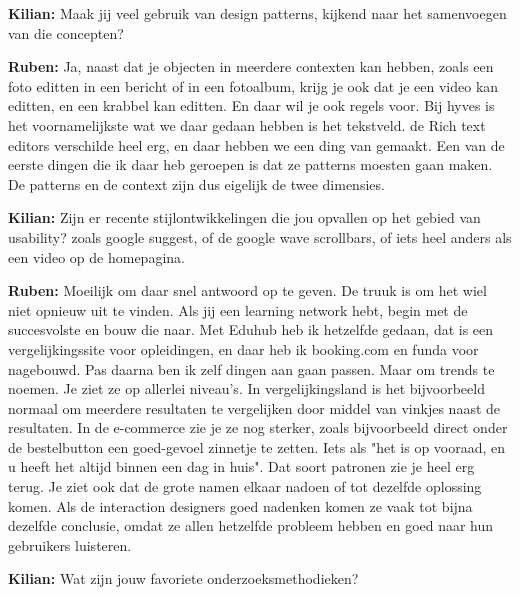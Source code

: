 \textbf{Kilian:} Maak jij veel gebruik van design patterns, kijkend naar het samenvoegen van die concepten?

\textbf{Ruben:} Ja, naast dat je objecten in meerdere contexten kan hebben, zoals een foto editten in een bericht of in een fotoalbum, krijg je ook dat je een video kan editten, en een krabbel kan editten. En daar wil je ook regels voor. Bij hyves is het voornamelijkste wat we daar gedaan hebben is het tekstveld. de Rich text editors verschilde heel erg, en daar hebben we een ding van gemaakt. Een van de eerste dingen die ik daar heb geroepen is dat ze patterns moesten gaan maken. De patterns en de context zijn dus eigelijk de twee dimensies.

\textbf{Kilian:} Zijn er recente stijlontwikkelingen die jou opvallen op het gebied van usability? zoals google suggest, of de google wave scrollbars, of iets heel anders als een video op de homepagina.

\textbf{Ruben:} Moeilijk om daar snel antwoord op te geven. De truuk is om het wiel niet opnieuw uit te vinden. Als jij een learning network hebt, begin met de succesvolste en bouw die naar. Met Eduhub heb ik hetzelfde gedaan, dat is een vergelijkingssite voor opleidingen, en daar heb ik booking.com en funda voor nagebouwd. Pas daarna ben ik zelf dingen aan gaan passen. Maar om trends te noemen. Je ziet ze op allerlei niveau's. In vergelijkingsland is het bijvoorbeeld normaal om meerdere resultaten te vergelijken door middel van vinkjes naast de resultaten. In de e-commerce zie je ze nog sterker, zoals bijvoorbeeld direct onder de bestelbutton een goed-gevoel zinnetje te zetten. Iets als "het is op vooraad, en u heeft het altijd binnen een dag in huis". Dat soort patronen zie je heel erg terug. Je ziet ook dat de grote namen elkaar nadoen of tot dezelfde oplossing komen. Als de interaction designers goed nadenken komen ze vaak tot bijna dezelfde conclusie, omdat ze allen hetzelfde probleem hebben en goed naar hun gebruikers luisteren.

\textbf{Kilian:} Wat zijn jouw favoriete onderzoeksmethodieken?

